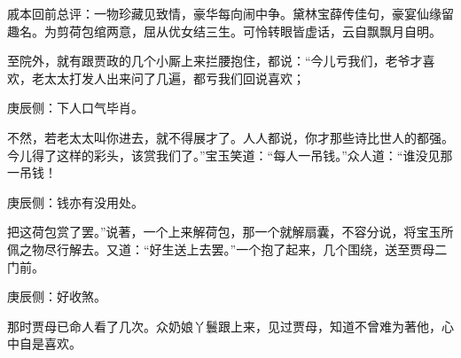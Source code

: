 
\begin{parag}
    \begin{note}戚本回前总评：一物珍藏见致情，豪华每向闹中争。黛林宝薛传佳句，豪宴仙缘留趣名。为剪荷包绾两意，屈从优女结三生。可怜转眼皆虚话，云自飘飘月自明。\end{note}
\end{parag}


\begin{parag}
    至院外，就有跟贾政的几个小厮上来拦腰抱住，都说：“今儿亏我们，老爷才喜欢，老太太打发人出来问了几遍，都亏我们回说喜欢；\begin{note}庚辰侧：下人口气毕肖。\end{note}不然，若老太太叫你进去，就不得展才了。人人都说，你才那些诗比世人的都强。今儿得了这样的彩头，该赏我们了。”宝玉笑道：“每人一吊钱。”众人道：“谁没见那一吊钱！\begin{note}庚辰侧：钱亦有没用处。\end{note}把这荷包赏了罢。”说著，一个上来解荷包，那一个就解扇囊，不容分说，将宝玉所佩之物尽行解去。又道：“好生送上去罢。”一个抱了起来，几个围绕，送至贾母二门前。\begin{note}庚辰侧：好收煞。\end{note}那时贾母已命人看了几次。众奶娘丫鬟跟上来，见过贾母，知道不曾难为著他，心中自是喜欢。
\end{parag}


